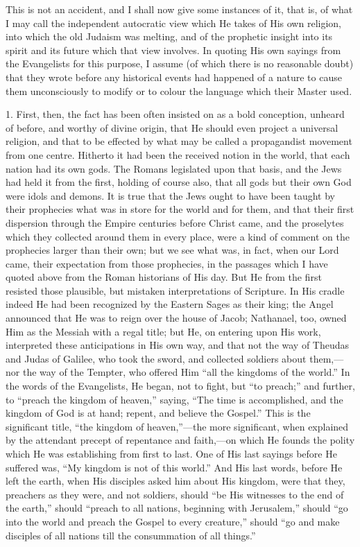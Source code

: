 This is not an accident, and I shall now give some instances of it,
that is, of what I may call the independent autocratic view which He
takes of His own religion, into which the old Judaism was melting, and
of the prophetic insight into its spirit and its future which that
view involves. In quoting His own sayings from the Evangelists for
this purpose, I assume (of which there is no reasonable doubt) that
they wrote before any historical events had happened of a nature to
cause them unconsciously to modify or to colour the language which
their Master used.

1. First, then, the fact has been often insisted on as a bold
conception, unheard of before, and worthy of divine origin, that He
should even project a universal religion, and that to be effected by
what may be called a propagandist movement from one centre. Hitherto
it had been the received notion in the world, that each nation had its
own gods. The Romans legislated upon that basis, and the Jews had held
it from the first, holding of course also, that all gods but their own
God were idols and demons. It is true that the Jews ought to have been
taught by their prophecies what was in store for the world and for
them, and that their first dispersion through the Empire centuries
before Christ came, and the proselytes which they collected around
them in every place, were a kind of comment on the prophecies larger
than their own; but we see what was, in fact, when our Lord came,
their expectation from those prophecies, in the passages which I have
quoted above from the Roman historians of His day. But He from the
first resisted those plausible, but mistaken interpretations of
Scripture. In His cradle indeed He had been recognized by the Eastern
Sages as their king; the Angel announced that He was to reign over the
house of Jacob; Nathanael, too, owned Him as the Messiah with a regal
title; but He, on entering upon His work, interpreted these
anticipations in His own way, and that not the way of Theudas and
Judas of Galilee, who took the sword, and collected soldiers about
them,—nor the way of the Tempter, who offered Him ``all the
kingdoms of the world.'' In the words of the Evangelists, He
began, not to fight, but ``to preach;'' and further, to
``preach the kingdom of heaven,'' saying, ``The time is
accomplished, and the kingdom of God is at hand; repent, and believe
the Gospel.'' This is the significant title, ``the kingdom of
heaven,''—the more significant, when explained by the attendant
precept of repentance and faith,—on which He founds the polity which
He was establishing from first to last. One of His last sayings before
He suffered was, ``My kingdom is not of this world.'' And His
last words, before He left the earth, when His disciples asked him
about His kingdom, were that they, preachers as they were, and not
soldiers, should ``be His witnesses to the end of the earth,''
should ``preach to all nations, beginning with Jerusalem,''
should ``go into the world and preach the Gospel to every
creature,'' should ``go and make disciples of all nations till
the consummation of all things.''

